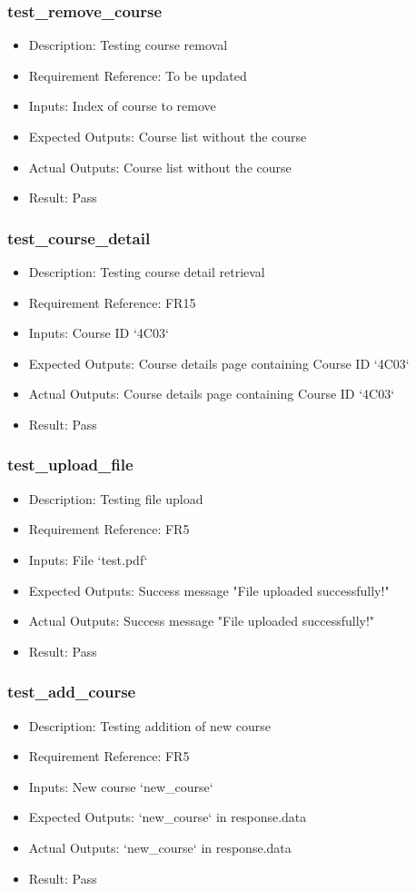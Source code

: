 \documentclass[12pt, titlepage]{article}
\begin{document}
\subsubsection{test\_remove\_course}\label{3.1.3}
\begin{itemize}
    \item Description: Testing course removal
    \item Requirement Reference: To be updated
    \item Inputs: Index of course to remove
    \item Expected Outputs: Course list without the course
    \item Actual Outputs: Course list without the course
    \item Result: Pass
\end{itemize}
\subsubsection{test\_course\_detail}\label{3.1.4}
\begin{itemize}
    \item Description: Testing course detail retrieval
    \item Requirement Reference: FR15
    \item Inputs: Course ID `4C03`
    \item Expected Outputs: Course details page containing Course ID `4C03`
    \item Actual Outputs: Course details page containing Course ID `4C03`
    \item Result: Pass
\end{itemize}
\subsubsection{test\_upload\_file}\label{3.1.5}
\begin{itemize}
    \item Description: Testing file upload
    \item Requirement Reference: FR5
    \item Inputs: File `test.pdf`
    \item Expected Outputs: Success message "File uploaded successfully!"
    \item Actual Outputs: Success message "File uploaded successfully!"
    \item Result: Pass
\end{itemize}
\subsubsection{test\_add\_course}\label{3.1.6}
\begin{itemize}
    \item Description: Testing addition of new course
    \item Requirement Reference: FR5
    \item Inputs: New course `new\_course`
    \item Expected Outputs: `new\_course` in response.data
    \item Actual Outputs: `new\_course` in response.data
    \item Result: Pass
\end{itemize}
\end{document}
